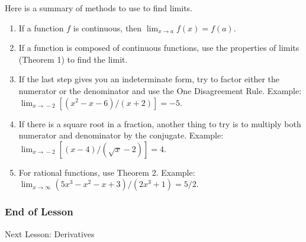 \documentclass[xcolor=dvipsnames]{beamer}
\begin{document}
\begin{frame}
Here is a summary of methods to use to find limits.
\begin{enumerate}
\item If a function $f$ is continuous, then
  $\lim_{x\rightarrow{}a}f(x)=f(a)$.
\item If a function is composed of continuous functions, use the
  properties of limits (Theorem 1) to find the limit.
\item If the last step gives you an indeterminate form, try to factor
  either the numerator or the denominator and use the One Disagreement
  Rule. Example: $\lim_{x\rightarrow{}-2}[(x^{2}-x-6)/(x+2)]=-5$.
\item If there is a square root in a fraction, another thing to try is
  to multiply both numerator and denominator by the conjugate.
  Example: $\lim_{x\rightarrow{}-2}[(x-4)/(\sqrt{x}-2)]=4$.
\item For rational functions, use Theorem 2. Example:
  $\lim_{x\rightarrow\infty}(5x^{3}-x^{2}-x+3)/(2x^{3}+1)=5/2$.
\end{enumerate}
\end{frame}

\begin{frame}
  \frametitle{End of Lesson}
Next Lesson: Derivatives
\end{frame}
\end{document}
